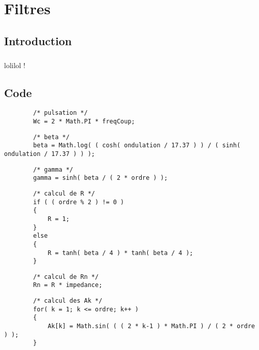
\chapter{Filtres}
    \section{Introduction}
        \paragraph{}
lolilol !

    \section{Code}
           \lstset{
                language=java, basicstyle=\ttfamily\small, columns=flexible,
                tabsize=2, extendedchars=true, showspaces=false,
                showstringspaces=false, numbers=left, numberstyle=\tiny,
                breaklines=true, breakautoindent=true, captionpos=b
            }

    \begin{lstlisting}
        /* pulsation */
        Wc = 2 * Math.PI * freqCoup;
    \end{lstlisting}


    \begin{lstlisting}
        /* beta */
        beta = Math.log( ( cosh( ondulation / 17.37 ) ) / ( sinh( ondulation / 17.37 ) ) );
    \end{lstlisting}


    \begin{lstlisting}
        /* gamma */
        gamma = sinh( beta / ( 2 * ordre ) );
    \end{lstlisting}


    \begin{lstlisting}
        /* calcul de R */
        if ( ( ordre % 2 ) != 0 )
        {
            R = 1;
        }
        else
        {
            R = tanh( beta / 4 ) * tanh( beta / 4 );
        }
    \end{lstlisting}


    \begin{lstlisting}
        /* calcul de Rn */
        Rn = R * impedance;
    \end{lstlisting}


    \begin{lstlisting}
        /* calcul des Ak */
        for( k = 1; k <= ordre; k++ )
        {
            Ak[k] = Math.sin( ( ( 2 * k-1 ) * Math.PI ) / ( 2 * ordre ) );
        }
    \end{lstlisting}


